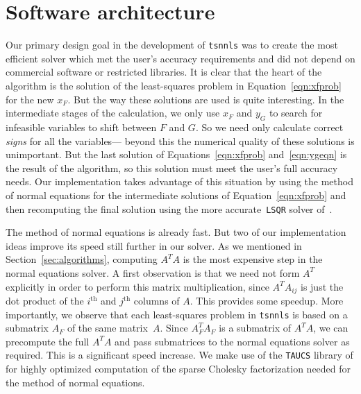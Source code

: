 \documentclass[onecolumn,12pt,tightenlines,amsmath,secnumarabic,%
    floatfix,amssymb,aps,nofootinbib,letterpaper, showkeys]{revtex4}
\renewcommand{\subsection}[1]{\medskip\noindent\textbf{#1.} }
\newcommand{\tsnnls}{\texttt{tsnnls} }
\begin{document}

\section{Software architecture}

Our primary design goal in the development of \tsnnls was to create the most efficient solver which met the user's accuracy requirements and did not depend on commercial software or restricted libraries. It is clear that the heart of the algorithm is the solution of the least-squares problem in Equation~\ref{eqn:xfprob} for the new $x_F$. But the way these solutions are used is quite interesting. In the intermediate stages of the calculation, we only use $x_F$ and $y_G$ to search for infeasible variables to shift between $F$ and $G$. So we need only calculate correct \textit{signs} for all the variables--- beyond this the numerical quality of these solutions is unimportant. But the last solution of Equations~\ref{eqn:xfprob} and~\ref{eqn:ygeqn} is the result of the algorithm, so this solution must meet the user's full accuracy needs. Our implementation takes advantage of this situation by using the method of normal equations for the intermediate solutions of Equation~\ref{eqn:xfprob} and then recomputing the final solution using the more accurate~\texttt{LSQR} solver of~\cite{355989}. 

The method of normal equations is already fast. But two of our implementation ideas improve its speed still further in our solver. As we mentioned in Section~\ref{sec:algorithms}, computing $A^{T}\!A$ is the most expensive step in the normal equations solver. A first observation is that we need not form $A^T$ explicitly in order to perform this matrix multiplication, since $A^T\!A_{ij}$ is just the dot product of the $i^{\text{th}}$ and $j^{\text{th}}$ columns of $A$. This provides some speedup. More importantly, we observe that each least-squares problem in \tsnnls is based on a submatrix $A_F$ of the same matrix~$A$. Since $A_F^T\!A_F$ is a submatrix of $A^T\!A$, we can precompute the full $A^T\!A$ and pass submatrices to the normal equations solver as required. This is a significant speed increase.
We make use of the \texttt{TAUCS} library of \cite{taucs} for highly optimized computation of the sparse Cholesky factorization needed for the method of normal equations.
\end{document}

